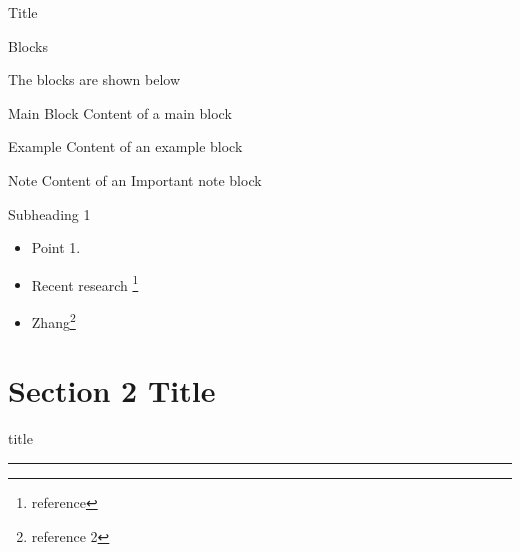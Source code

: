 \documentclass{beamer} %
\begin{document}
\begin{frame}{Title}
\begin{figure}
                
    \end{figure}
\end{frame}

\begin{frame}[c]{Blocks}
	
The blocks are shown below
\begin{block}{Main Block}
	Content of a main block
\end{block}

\begin{exampleblock}{Example}
	Content of an example block
\end{exampleblock}

\begin{alertblock}{Note}
	Content of an Important note block
\end{alertblock}

\end{frame}	

\begin{frame}{Subheading 1}
\begin{itemize}
  \item Point 1.
  
  
  \item Recent research \footnote{\tiny reference} 
  
  \item Zhang\footnote{\tiny reference 2 } 
  
 
\end{itemize}

\end{frame}


\section{\textbf{Section 2 Title}}
    \begin{frame}[plain]
        \vfill
      \centering
      \begin{beamercolorbox}[sep=8pt,center,shadow=true,rounded=true]{title}
        \insertsectionhead\par%
        \color{orange}\noindent\rule{10cm}{1pt}
      \end{beamercolorbox}
      \vfill
  \end{frame}
\end{document}

